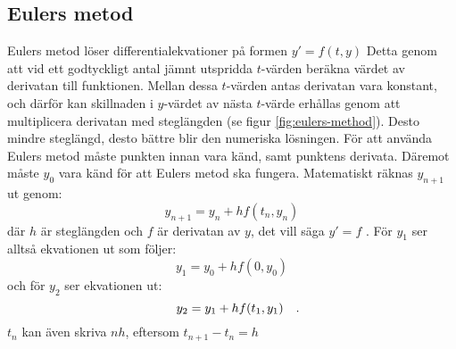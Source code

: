 \subsection{Eulers metod}
Eulers metod löser differentialekvationer på formen \(y'=f(t, y)\) Detta genom att vid ett godtyckligt antal jämnt utspridda \(t\)-värden beräkna värdet av derivatan till funktionen. Mellan dessa \(t\)-värden antas derivatan vara konstant, och därför kan skillnaden i \(y\)-värdet av nästa \(t\)-värde erhållas genom att multiplicera derivatan med steglängden (se figur \ref{fig:eulers-method}). Desto mindre steglängd, desto bättre blir den numeriska lösningen. För att använda Eulers metod måste punkten innan vara känd, samt punktens derivata. Däremot måste \(y_0\) vara känd för att Eulers metod ska fungera. Matematiskt räknas \(y_{n+1}\) ut genom:
\begin{equation}\label{eq:eulers_method_def}
    y_{n+1}=y_n+hf(t_n, y_n)
\end{equation} där \(h\) är steglängden och \(f\) är derivatan av \(y\), det vill säga \(y'=f\) \parencite[317]{suli_introduction_2003}. För \(y_1\) ser alltså ekvationen ut som följer:
\begin{equation}
    y_1=y_0+hf(0, y_0)
\end{equation}
och för \(y_2\) ser ekvationen ut:
\begin{equation}
    y_2=y_1+hf(t_1, y_1)
\quad\mathrm{.}\!\!\!\!\!\!\end{equation}
\(t_n\) kan även skriva \(nh\), eftersom \(t_{n+1}-t_n=h\)

